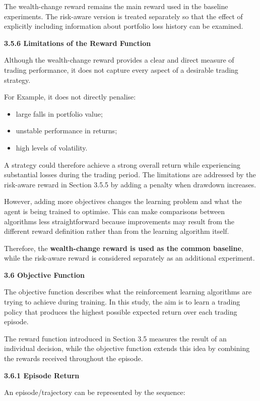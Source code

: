 The wealth-change reward remains the main reward used in the baseline
experiments. The risk-aware version is treated separately so that the
effect of explicitly including information about portfolio loss history
can be examined.

\textbf{3.5.6 Limitations of the Reward Function}

Although the wealth-change reward provides a clear and direct measure of
trading performance, it does not capture every aspect of a desirable
trading strategy.

For Example, it does not directly penalise:

\begin{itemize}
\item
  large falls in portfolio value;
\item
  unstable performance in returns;
\item
  high levels of volatility.
\end{itemize}

A strategy could therefore achieve a strong overall return while
experiencing substantial losses during the trading period. The
limitations are addressed by the risk-aware reward in Section 3.5.5 by
adding a penalty when drawdown increases.

However, adding more objectives changes the learning problem and what
the agent is being trained to optimise. This can make comparisons
between algorithms less straightforward because improvements may result
from the different reward definition rather than from the learning
algorithm itself.

Therefore, the \textbf{wealth-change reward is used as the common
baseline}, while the risk-aware reward is considered separately as an
additional experiment.

\textbf{3.6 Objective Function}

The objective function describes what the reinforcement learning
algorithms are trying to achieve during training. In this study, the aim
is to learn a trading policy that produces the highest possible expected
return over each trading episode.

The reward function introduced in Section 3.5 measures the result of an
individual decision, while the objective function extends this idea by
combining the rewards received throughout the episode.

\textbf{3.6.1 Episode Return}

An episode/trajectory can be represented by the sequence:

